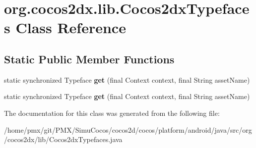\hypertarget{classorg_1_1cocos2dx_1_1lib_1_1Cocos2dxTypefaces}{}\section{org.\+cocos2dx.\+lib.\+Cocos2dx\+Typefaces Class Reference}
\label{classorg_1_1cocos2dx_1_1lib_1_1Cocos2dxTypefaces}
\subsection*{Static Public Member Functions}
\begin{DoxyCompactItemize}
\item 
\mbox{\label{classorg_1_1cocos2dx_1_1lib_1_1Cocos2dxTypefaces_a1a85b96ab07ce7e5916d73b33c7570ba}} 
static synchronized Typeface {\bfseries get} (final Context context, final String asset\+Name)
\item 
\mbox{\label{classorg_1_1cocos2dx_1_1lib_1_1Cocos2dxTypefaces_a1a85b96ab07ce7e5916d73b33c7570ba}} 
static synchronized Typeface {\bfseries get} (final Context context, final String asset\+Name)
\end{DoxyCompactItemize}


The documentation for this class was generated from the following file\+:\begin{DoxyCompactItemize}
\item 
/home/pmx/git/\+P\+M\+X/\+Simu\+Cocos/cocos2d/cocos/platform/android/java/src/org/cocos2dx/lib/Cocos2dx\+Typefaces.\+java\end{DoxyCompactItemize}
